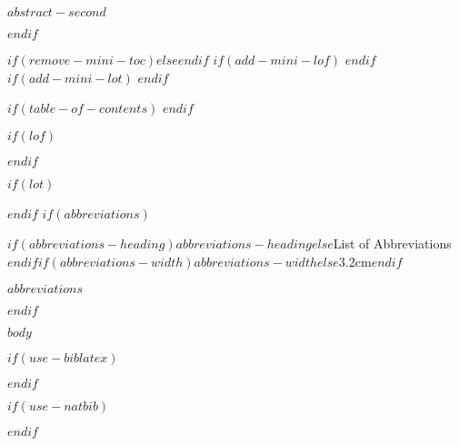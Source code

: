 \documentclass[letterpaper, $if(page-layout)$$page-layout$$else$nobind$endif$]{templates/ociamthesis}
\begin{document}
\begin{romanpages}
\renewcommand{\abstractsecondtitle}{$abstract-second-heading$}
\begin{abstractsecond}
	$abstract-second$
\end{abstractsecond}

$endif$

$if(remove-mini-toc)$$else$\dominitoc$endif$ %
$if(add-mini-lof)$
  \dominilof  %
$endif$
$if(add-mini-lot)$
  \dominilot  %
$endif$

\flushbottom

$if(table-of-contents)$
\tableofcontents
$endif$

$if(lof)$
\listoffigures
	\mtcaddchapter
$endif$

$if(lot)$
\listoftables
  \mtcaddchapter
$endif$
$if(abbreviations)$
\begin{mclistof}{$if(abbreviations-heading)$$abbreviations-heading$$else$List of Abbreviations$endif$}{$if(abbreviations-width)$$abbreviations-width$$else$3.2cm$endif$}

$abbreviations$

\end{mclistof} 

$endif$

\end{romanpages}

\flushbottom

$body$

$if(use-biblatex)$
\setlength{\baselineskip}{0pt} %

{\renewcommand*\MakeUppercase[1]{#1}%
\printbibliography[heading=none]}

$endif$

$if(use-natbib)$

$endif$
\end{document}
